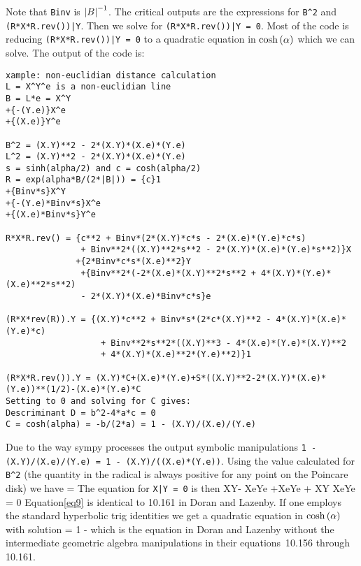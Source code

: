 \documentclass{article}
\begin{document}
Note that {\tt Binv} is $\left | {B} \right |^{-1}$.  The critical outputs are the
expressions for {\tt B\verb!^!2} and {\tt (R*X*R.rev())\verb!|Y!}. Then we solve
for {\tt (R*X*R.rev())\verb!|!Y = 0}.  Most of the code is reducing {\tt (R*X*R.rev())\verb!|Y! = 0}
to a quadratic equation in $\cosh\left (\alpha\right )$ which we can solve.  The output of the code is:
\begin{verbatim}
xample: non-euclidian distance calculation
L = X^Y^e is a non-euclidian line
B = L*e = X^Y
+{-(Y.e)}X^e
+{(X.e)}Y^e

B^2 = (X.Y)**2 - 2*(X.Y)*(X.e)*(Y.e)
L^2 = (X.Y)**2 - 2*(X.Y)*(X.e)*(Y.e)
s = sinh(alpha/2) and c = cosh(alpha/2)
R = exp(alpha*B/(2*|B|)) = {c}1
+{Binv*s}X^Y
+{-(Y.e)*Binv*s}X^e
+{(X.e)*Binv*s}Y^e

R*X*R.rev() = {c**2 + Binv*(2*(X.Y)*c*s - 2*(X.e)*(Y.e)*c*s) 
               + Binv**2*((X.Y)**2*s**2 - 2*(X.Y)*(X.e)*(Y.e)*s**2)}X
              +{2*Binv*c*s*(X.e)**2}Y
               +{Binv**2*(-2*(X.e)*(X.Y)**2*s**2 + 4*(X.Y)*(Y.e)*(X.e)**2*s**2) 
               - 2*(X.Y)*(X.e)*Binv*c*s}e

(R*X*rev(R)).Y = {(X.Y)*c**2 + Binv*s*(2*c*(X.Y)**2 - 4*(X.Y)*(X.e)*(Y.e)*c) 
                   + Binv**2*s**2*((X.Y)**3 - 4*(X.e)*(Y.e)*(X.Y)**2 
                   + 4*(X.Y)*(X.e)**2*(Y.e)**2)}1

(R*X*R.rev()).Y = (X.Y)*C+(X.e)*(Y.e)+S*((X.Y)**2-2*(X.Y)*(X.e)*(Y.e))**(1/2)-(X.e)*(Y.e)*C
Setting to 0 and solving for C gives:
Descriminant D = b^2-4*a*c = 0
C = cosh(alpha) = -b/(2*a) = 1 - (X.Y)/(X.e)/(Y.e)
\end{verbatim}
Due to the way sympy processes the output symbolic manipulations {\tt 1 - (X.Y)/(X.e)/(Y.e) =
1 - (X.Y)/((X.e)*(Y.e))}.  Using the value calculated for {\tt B\verb!^!2} 
(the quantity in the radical is always positive for any point 
on the Poincare disk) we have
\be 
{} = 
\ee
The equation for {\tt X\verb!|!Y = 0} is then
\be\label{eq9}
\hspace{-0.25in}\lp X\cdot Y- \lp X\cdot e\rp\lp Y\cdot e \rp \rp\cosh\lp\alpha\rp+\lp X\cdot e\rp\lp Y\cdot e \rp+
\lp X\cdot Y \rp\lp X\cdot e\rp\lp Y\cdot e \rp{}\sinh\lp\alpha \rp = 0
\ee
Equation\ref{eq9} is identical to 10.161 in Doran and
Lazenby.  If one employs the standard hyperbolic trig identities we get a quadratic 
equation in $\cosh\left (\alpha\right )$ with solution 
\be
	\cosh\lp\alpha\rp = 1 - 
\ee
which is the equation in Doran and 
Lazenby without the intermediate geometric algebra manipulations in their equations~10.156 through 10.161.
\end{document}
